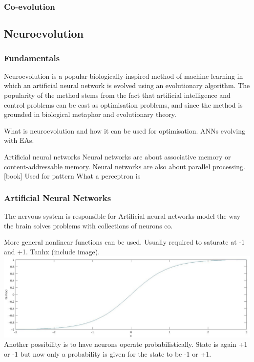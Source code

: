 \documentclass[11pt,a4paper]{article}
\begin{document}
\subsubsection{Co-evolution}
\subsection{Neuroevolution}
\subsubsection{Fundamentals}
Neuroevolution is a popular biologically-inspired method of machine learning in which an artificial neural network is evolved using an evolutionary algorithm. The popularity of the method stems from the fact that artificial intelligence and control problems can be cast as optimisation problems, and since the method is grounded in biological metaphor and evolutionary theory.\cite{risi}

What is neuroevolution and how it can be used for optimisation. ANNs evolving with EAs.

Artificial neural networks  
Neural networks are about associative memory or content-addressable memory. Neural networks are also about parallel processing.[book] 
Used for pattern 
What a perceptron is

\subsubsection{Artificial Neural Networks}

The nervous system is responsible for 
Artificial neural networks model the way the brain solves problems with collections of neurons co.  

More general nonlinear functions can be used. Usually required to saturate at -1 and +1. Tanhx (include image). \\
\includegraphics[width=\textwidth]{tanh}
Another possibility is to have neurons operate probabilistically. State is again +1 or -1 but now only a probability is given for the state to be -1 or +1.
\end{document}
